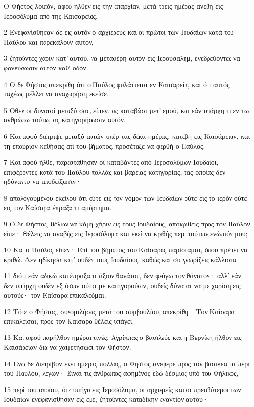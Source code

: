 \par Ο Φήστος λοιπόν, αφού ήλθεν εις την επαρχίαν, μετά τρεις ημέρας ανέβη εις Ιεροσόλυμα από της Καισαρείας.
\par 2 Ενεφανίσθησαν δε εις αυτόν ο αρχιερεύς και οι πρώτοι των Ιουδαίων κατά του Παύλου και παρεκάλουν αυτόν,
\par 3 ζητούντες χάριν κατ' αυτού, να μεταφέρη αυτόν εις Ιερουσαλήμ, ενεδρεύοντες να φονεύσωσιν αυτόν καθ' οδόν.
\par 4 Ο δε Φήστος απεκρίθη ότι ο Παύλος φυλάττεται εν Καισαρεία, και ότι αυτός ταχέως μέλλει να αναχωρήση εκείσε.
\par 5 Όθεν οι δυνατοί μεταξύ σας, είπεν, ας καταβώσι μετ' εμού, και εάν υπάρχη τι εν τω ανθρώπω τούτω, ας κατηγορήσωσιν αυτόν.
\par 6 Και αφού διέτριψε μεταξύ αυτών υπέρ τας δέκα ημέρας, κατέβη εις Καισάρειαν, και τη επαύριον καθήσας επί του βήματος, προσέταξε να φερθή ο Παύλος.
\par 7 Και αφού ήλθε, παρεστάθησαν οι καταβάντες από Ιεροσολύμων Ιουδαίοι, επιφέροντες κατά του Παύλου πολλάς και βαρείας κατηγορίας, τας οποίας δεν ηδύναντο να αποδείξωσιν·
\par 8 απολογουμένου εκείνου ότι ούτε εις τον νόμον των Ιουδαίων ούτε εις το ιερόν ούτε εις τον Καίσαρα έπραξα τι αμάρτημα.
\par 9 Ο δε Φήστος, θέλων να κάμη χάριν εις τους Ιουδαίους, αποκριθείς προς τον Παύλον είπε· Θέλεις να αναβής εις Ιεροσόλυμα και εκεί να κριθής περί τούτων ενώπιόν μου;
\par 10 Και ο Παύλος είπεν· Επί του βήματος του Καίσαρος παρίσταμαι, όπου πρέπει να κριθώ. Δεν ηδίκησα κατ' ουδέν τους Ιουδαίους, καθώς και συ γνωρίζεις κάλλιστα·
\par 11 διότι εάν αδικώ και έπραξα τι άξιον θανάτου, δεν φεύγω τον θάνατον· αλλ' εάν δεν υπάρχη ουδέν εξ όσων ούτοι με κατηγορούσιν, ουδείς δύναται να με χαρίση εις αυτούς· τον Καίσαρα επικαλούμαι.
\par 12 Τότε ο Φήστος, συνομιλήσας μετά του συμβουλίου, απεκρίθη· Τον Καίσαρα επικαλείσαι, προς τον Καίσαρα θέλεις υπάγει.
\par 13 Και αφού παρήλθον ημέραι τινές, Αγρίππας ο βασιλεύς και η Βερνίκη ήλθον εις Καισάρειαν διά να χαιρετήσωσι τον Φήστον.
\par 14 Ενώ δε διέτριβον εκεί ημέρας πολλάς, ο Φήστος ανέφερε προς τον βασιλέα τα περί του Παύλου, λέγων· Είναι τις άνθρωπος αφημένος εδώ δέσμιος υπό του Φήλικος,
\par 15 περί του οποίου, ότε υπήγα εις Ιεροσόλυμα, οι αρχιερείς και οι πρεσβύτεροι των Ιουδαίων ενεφανίσθησαν εις εμέ, ζητούντες καταδίκην εναντίον αυτού·
